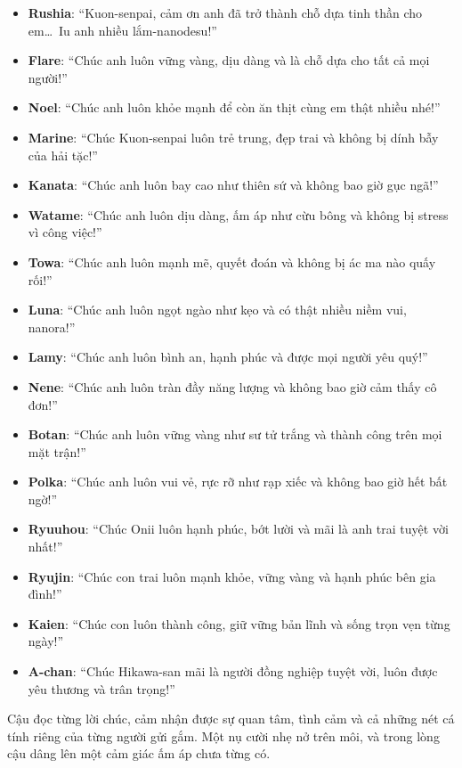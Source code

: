\documentclass[../main.tex]{subfiles}
\begin{document}
\begin{itemize}
    \item \textbf{Rushia}: ``Kuon-senpai, cảm ơn anh đã trở thành chỗ dựa tinh thần cho em\dots\ Iu anh nhiều lắm-nanodesu!''
    \item \textbf{Flare}: ``Chúc anh luôn vững vàng, dịu dàng và là chỗ dựa cho tất cả mọi người!''
    \item \textbf{Noel}: ``Chúc anh luôn khỏe mạnh để còn ăn thịt cùng em thật nhiều nhé!''
    \item \textbf{Marine}: ``Chúc Kuon-senpai luôn trẻ trung, đẹp trai và không bị dính bẫy của hải tặc!''
    \item \textbf{Kanata}: ``Chúc anh luôn bay cao như thiên sứ và không bao giờ gục ngã!''
    \item \textbf{Watame}: ``Chúc anh luôn dịu dàng, ấm áp như cừu bông và không bị stress vì công việc!''
    \item \textbf{Towa}: ``Chúc anh luôn mạnh mẽ, quyết đoán và không bị ác ma nào quấy rối!''
    \item \textbf{Luna}: ``Chúc anh luôn ngọt ngào như kẹo và có thật nhiều niềm vui, nanora!''
    \item \textbf{Lamy}: ``Chúc anh luôn bình an, hạnh phúc và được mọi người yêu quý!''
    \item \textbf{Nene}: ``Chúc anh luôn tràn đầy năng lượng và không bao giờ cảm thấy cô đơn!''
    \item \textbf{Botan}: ``Chúc anh luôn vững vàng như sư tử trắng và thành công trên mọi mặt trận!''
    \item \textbf{Polka}: ``Chúc anh luôn vui vẻ, rực rỡ như rạp xiếc và không bao giờ hết bất ngờ!''
    \item \textbf{Ryuuhou}: ``Chúc Onii luôn hạnh phúc, bớt lười và mãi là anh trai tuyệt vời nhất!''
    \item \textbf{Ryujin}: ``Chúc con trai luôn mạnh khỏe, vững vàng và hạnh phúc bên gia đình!''
    \item \textbf{Kaien}: ``Chúc con luôn thành công, giữ vững bản lĩnh và sống trọn vẹn từng ngày!''
    \item \textbf{A-chan}: ``Chúc Hikawa-san mãi là người đồng nghiệp tuyệt vời, luôn được yêu thương và trân trọng!''
\end{itemize}

Cậu đọc từng lời chúc, cảm nhận được sự quan tâm, tình cảm và cả những nét cá tính riêng của từng người gửi gắm. Một nụ cười nhẹ nở trên môi, và trong lòng cậu dâng lên một cảm giác ấm áp chưa từng có.
\end{document}
